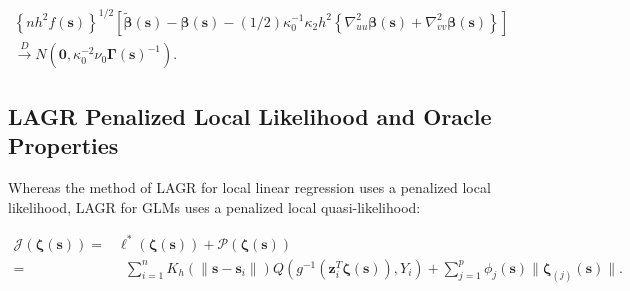 \documentclass[authoryear,review, 12pt]{elsarticle}
\begin{document}
\begin{gather*}
\left\{ nh^{2}f(\bm{s})\right\} ^{1/2}\left[\tilde{\bm{\beta}}(\bm{s})-\bm{\beta}(\bm{s})-(1/2)\kappa_{0}^{-1}\kappa_{2}h^{2}\left\{ \nabla_{uu}^{2}\bm{\beta}(\bm{s})+\nabla_{vv}^{2}\bm{\beta}(\bm{s})\right\} \right]\\
\xrightarrow{{D}}N\left(\bm{0},\kappa_{0}^{-2}\nu_{0}\bm{\Gamma}(\bm{s})^{-1}\right).
\end{gather*}



\subsection{LAGR Penalized Local Likelihood and Oracle Properties}

Whereas the method of LAGR for local linear regression uses a penalized
local likelihood, LAGR for GLMs uses a penalized local quasi-likelihood:

\begin{align*}
\mathcal{J}\left(\bm{\zeta}(\bm{s})\right)= & \mathcal{\ell}^{*}\left(\bm{\zeta}(\bm{s})\right)+\mathcal{P}\left(\bm{\zeta}(\bm{s})\right)\\
= & \;\; \sum_{i=1}^{n}K_{h}\left(\|\bm{s}-\bm{s}_{i}\|\right)Q\left(g^{-1}\left(\bm{z}_{i}^{T}\bm{\zeta}(\bm{s})\right),Y_{i}\right)+\sum_{j=1}^{p}\phi_{j}(\bm{s})\|\bm{\zeta}_{(j)}(\bm{s})\|.
\end{align*}
\end{document}
